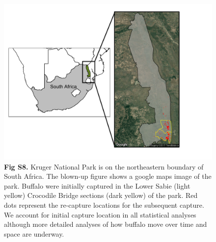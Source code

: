 \documentclass[11pt]{article}
\begin{document}
\begin{figure}[H]
\centering
\includegraphics[width=.99\linewidth]{Figure_S8.pdf}
\caption*{\textbf{Fig S8.} Kruger National Park is on the northeastern boundary of South Africa.  The blown-up figure shows a google maps image of the park. Buffalo were initially captured in the Lower Sabie (light yellow) Crocodile Bridge sections (dark yellow) of the park. Red dots represent the re-capture locations for the subsequent capture. We account for initial capture location in all statistical analyses although more detailed analyses of how buffalo move over time and space are underway.}
\end{figure}

\pagebreak



\end{document}

